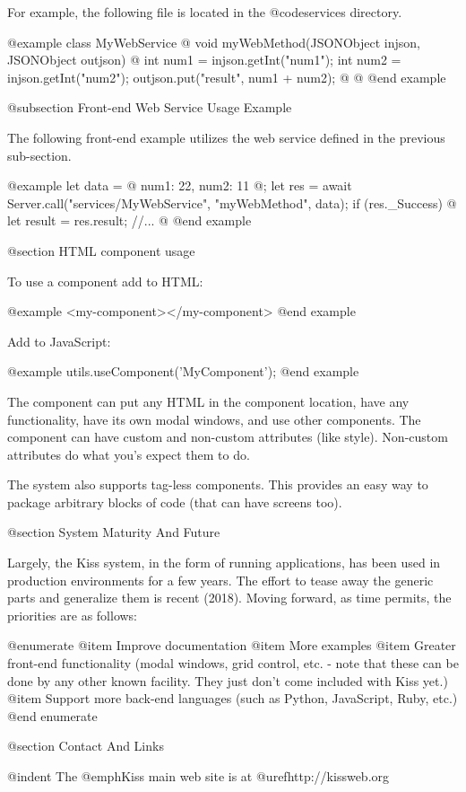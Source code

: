 For example, the following file is located in the
@code{services} directory.

@example
class MyWebService @{
    void myWebMethod(JSONObject injson, JSONObject outjson) @{
        int num1 = injson.getInt("num1");
        int num2 = injson.getInt("num2");
        outjson.put("result", num1 + num2);
    @}
@}
@end example

@subsection Front-end Web Service Usage Example

The following front-end example utilizes the web service defined in the
previous sub-section.

@example
let data = @{
    num1:  22,
    num2:  11
@};
let res = await Server.call("services/MyWebService", "myWebMethod", data);
if (res._Success) @{
    let result = res.result;
    //...
@}
@end example
    
@section HTML component usage
   
To use a component add to HTML:

@example
<my-component></my-component>
@end example

Add to JavaScript:

@example
utils.useComponent('MyComponent');
@end example
    
The component can put any HTML in the component location, have any
functionality, have its own modal windows, and use other components.
The component can have custom and non-custom attributes (like style).
Non-custom attributes do what you's expect them to do.

The system also supports tag-less components.  This provides an easy
way to package arbitrary blocks of code (that can have screens too).

@section System Maturity And Future

Largely, the Kiss system, in the form of running applications, has
been used in production environments for a few years.  The effort to
tease away the generic parts and generalize them is recent (2018).
Moving forward, as time permits, the priorities are as follows:

@enumerate
@item
Improve documentation
@item
More examples
@item
Greater front-end functionality (modal windows, grid control, etc. - note that these can be done by any other known facility.  They just don't come included with Kiss yet.)
@item
Support more back-end languages (such as Python, JavaScript, Ruby, etc.)
@end enumerate

@section Contact And Links

@indent
The @emph{Kiss} main web site is at @uref{http://kissweb.org}

